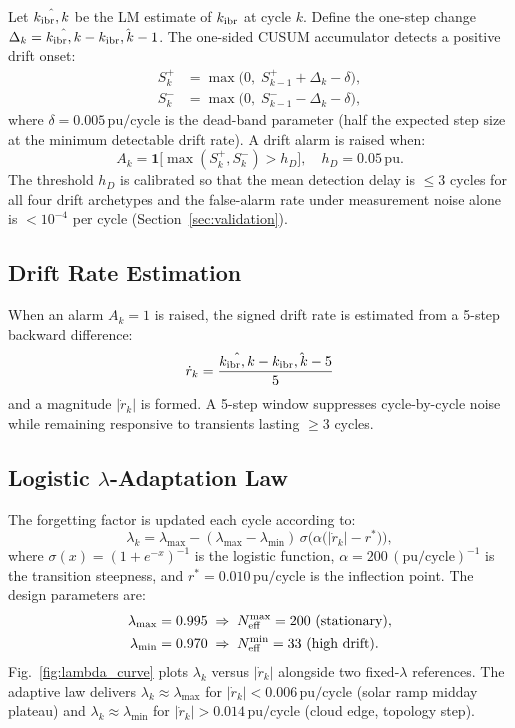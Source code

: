 \documentclass[journal]{IEEEtran}
\newcommand{\kibr}{k_{\rm ibr}}
\newcommand{\lambdamax}{\lambda_{\max}}
\newcommand{\lambdamin}{\lambda_{\min}}
\newcommand{\Neff}{N_{\rm eff}}
\newcommand{\rdot}{\dot{r}_k}
\begin{document}
Let $\hat{\kibr,k}$ be the LM estimate of $\kibr$ at cycle $k$.
Define the one-step change $\Delta_k = \hat{\kibr,k} - \hat{\kibr,k-1}$.
The one-sided CUSUM accumulator detects a positive drift onset:
\begin{align}
  S_k^+ &= \max\bigl(0,\; S_{k-1}^+ + \Delta_k - \delta\bigr),
  \label{eq:cusum_pos} \\
  S_k^- &= \max\bigl(0,\; S_{k-1}^- - \Delta_k - \delta\bigr),
  \label{eq:cusum_neg}
\end{align}
where $\delta = 0.005\,\text{pu/cycle}$ is the dead-band parameter
(half the expected step size at the minimum detectable drift rate).
A drift alarm is raised when:
\begin{equation}
  A_k = \mathbf{1}\bigl[\max(S_k^+, S_k^-) > h_D\bigr],
  \quad h_D = 0.05\,\text{pu}.
  \label{eq:alarm}
\end{equation}
The threshold $h_D$ is calibrated so that the mean detection delay
is $\leq 3$ cycles for all four drift archetypes and the false-alarm
rate under measurement noise alone is $< 10^{-4}$ per cycle
(Section~\ref{sec:validation}).

\subsection{Drift Rate Estimation}

When an alarm $A_k = 1$ is raised, the signed drift rate is estimated
from a 5-step backward difference:
\begin{equation}
  \rdot = \frac{\hat{\kibr,k} - \hat{\kibr,k-5}}{5}
  \label{eq:rdot}
\end{equation}
and a magnitude $|\rdot|$ is formed.  A 5-step window suppresses
cycle-by-cycle noise while remaining responsive to transients lasting
$\geq 3$ cycles.

\subsection{Logistic $\lambda$-Adaptation Law}

The forgetting factor is updated each cycle according to:
\begin{equation}
  \lambda_k = \lambdamax - (\lambdamax - \lambdamin)\,
    \sigma\!\bigl(\alpha\bigl(|\rdot| - r^*\bigr)\bigr),
  \label{eq:lambda_law}
\end{equation}
where $\sigma(x) = (1 + e^{-x})^{-1}$ is the logistic function,
$\alpha = 200\,(\text{pu/cycle})^{-1}$ is the transition steepness,
and $r^* = 0.010\,\text{pu/cycle}$ is the inflection point.  The
design parameters are:
\begin{align*}
  \lambdamax &= 0.995 \;\Rightarrow\; \Neff^{\max} = 200 \text{ (stationary)}, \\
  \lambdamin &= 0.970 \;\Rightarrow\; \Neff^{\min} = 33 \text{ (high drift)}.
\end{align*}
Fig.~\ref{fig:lambda_curve} plots $\lambda_k$ versus $|\rdot|$
alongside two fixed-$\lambda$ references.  The adaptive law delivers
$\lambda_k \approx \lambdamax$ for $|\rdot| < 0.006\,\text{pu/cycle}$
(solar ramp midday plateau) and $\lambda_k \approx \lambdamin$ for
$|\rdot| > 0.014\,\text{pu/cycle}$ (cloud edge, topology step).
\end{document}
